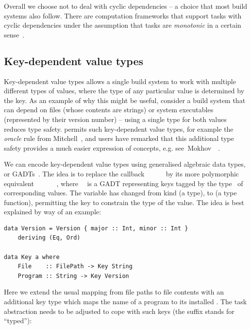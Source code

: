 Overall we choose not to deal with cyclic dependencies -- a choice that most build
systems also follow. There are computation frameworks that support tasks with
cyclic dependencies under the assumption that tasks are \emph{monotonic} in a
certain sense~\cite{pottier2009lazy,radul2009propagation}.

\subsection{Key-dependent value types}\label{sec-polymorphism}

Key-dependent value types allows a single build system to work with multiple different
types of values, where the type of any particular value is determined by the key. As an example
of why this might be useful, consider a build system that can depend on files
(whose contents are strings) or system executables (represented by their version number) --
using a single type for both values reduces type safety.
\Shake permits such key-dependent value types, for example the \emph{oracle} rule from
Mitchell~, and users have remarked that this additional type safety
provides a much easier expression of concepts, e.g. see~Mokhov~\etal~.

We can encode key-dependent value types using generalised algebraic data types,
or GADTs~\cite{spj2006gadts}. The idea is to replace
the callback ~\hs{::}~~\hs{->}~~ by its
more polymorphic equivalent ~\hs{::}~~~\hs{->}~~,
where~~ is a GADT representing keys tagged by the type~ of
corresponding values. The variable  has changed from kind \hs{*} (a type),
to \hs{* -> *} (a type function), permitting the key to constrain the type of the value.
The idea is best explained by way of an example:

\vspace{1mm}
\begin{verbatim}
data Version = Version { major :: Int, minor :: Int }
    deriving (Eq, Ord)

data Key a where
    File    :: FilePath -> Key String
    Program :: String -> Key Version
\end{verbatim}
\vspace{1mm}

\noindent
Here we extend the usual mapping from file paths to file contents with an
additional key type  which maps the name of a program to its installed . The task
abstraction needs to be adjusted to cope with such keys (the suffix 
stands for ``typed''):

